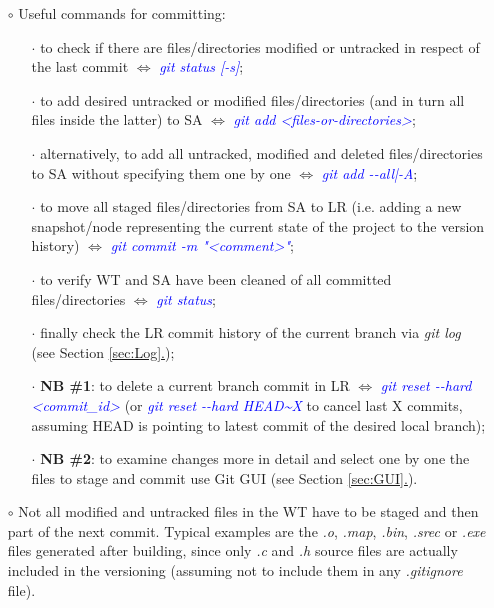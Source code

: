 \documentclass[a4paper,portrait,10pt]{article}   %
\newcommand{\mybulletlvA}{$\circ$}   %
\newcommand{\mybulletlvB}{$\cdot$}   %
\newcommand{\mydiv}{$\Leftrightarrow$ }   %
\newcommand{\mycmd}[1]{\textcolor{blue}{\textit{#1}}}   %
\newcommand{\myparvspace}{\vspace{4mm}}   %
\newcommand{\mysecvspace}{\vspace{6mm}}   %
\newcommand{\mysecref}[1]{\hyperref[#1]{\ref{#1}.}}   %
\begin{document}
\begin{itemize}
\item[\mybulletlvA] Useful commands for committing:
\begin{itemize}
  \item[\mybulletlvB] to check if there are files/directories modified or untracked in respect of the last commit \mydiv \mycmd{git status [-s]};
  \item[\mybulletlvB] to add desired untracked or modified files/directories (and in turn all files inside the latter) to SA \mydiv \mycmd{git add <files-or-directories>};
  \item[\mybulletlvB] alternatively, to add all untracked, modified and deleted files/directories to SA without specifying them one by one \mydiv \mycmd{git add -{}-all|-A};
  \item[\mybulletlvB] to move all staged files/directories from SA to LR (i.e. adding a new snapshot/node representing the current state of the project to the version history) \mydiv \mycmd{git commit -m "<comment>"};
  \item[\mybulletlvB] to verify WT and SA have been cleaned of all committed files/directories \mydiv \mycmd{git status};
  \item[\mybulletlvB] finally check the LR commit history of the current branch via \textit{git log} (see Section \mysecref{sec:Log});
  \item[\mybulletlvB] \textbf{NB \#1}: to delete a current branch commit in LR \mydiv \mycmd{git reset -{}-hard <commit\_id>} (or \mycmd{git reset -{}-hard HEAD\textasciitilde X} to cancel last X commits, assuming HEAD is pointing to latest commit of the desired local branch);
  \item[\mybulletlvB] \textbf{NB \#2}: to examine changes more in detail and select one by one the files to stage and commit use Git GUI (see Section \mysecref{sec:GUI}).
\end{itemize}
\myparvspace

\item[\mybulletlvA] Not all modified and untracked files in the WT have to be staged and then part of the next commit. Typical examples are the \textit{.o}, \textit{.map}, \textit{.bin}, \textit{.srec} or \textit{.exe} files generated after building, since only \textit{.c} and \textit{.h} source files are actually included in the versioning (assuming not to include them in any \textit{.gitignore} file).
\end{itemize}
\mysecvspace
\end{document}

